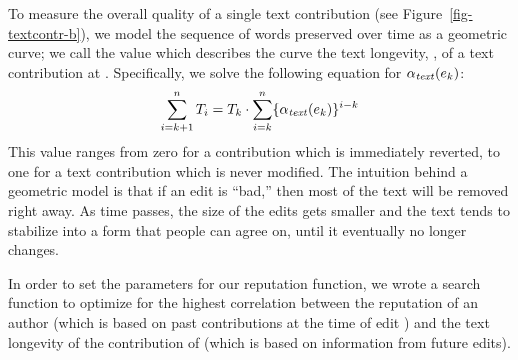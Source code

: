   To measure the overall quality of a single text contribution
  (see Figure~\ref{fig-textcontr-b}), we model the sequence of
  words preserved over time as a geometric curve; we call the
  value which describes the curve
  the text longevity, \tlong, of a text contribution at .
  Specifically, we solve the following equation for $\alpha_\text{\textit{text}}(e_{k})$:
  \begin{equation*}
  	\sum_{i=k+1}^n T_i = T_k \cdot
		\sum_{i=k}^n \{ \alpha_\text{\textit{text}}(e_{k}) \}^{i-k}
  \end{equation*}
  This value ranges from zero for a contribution which is immediately
  reverted, to one for a text contribution which is never modified.
  The intuition behind a geometric model is that if an edit is
  ``bad,'' then most of the text will be removed right away.
  As time passes, the size of the edits gets smaller and
  the text tends to stabilize into a form
  that people can agree on, until it eventually no longer changes.

  In order to set the parameters for our reputation function,
  we wrote a search function to optimize for the highest
  correlation between the reputation of an author (which is
  based on past contributions at the time of edit )
  and the text longevity of the contribution of 
  (which is based on information from future edits).

